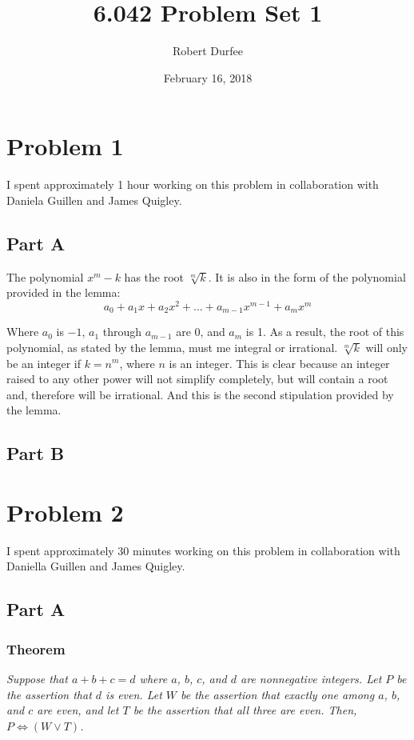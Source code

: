 \documentclass{article}
\title{ 6.042 Problem Set 1 }
\author{ Robert Durfee }
\date{ February 16, 2018 }
\begin{document}
\maketitle

\section*{Problem 1 }

I spent approximately 1 hour working on this problem in collaboration with
Daniela Guillen and James Quigley.

\subsection*{Part A}

The polynomial $ x^{m} - k $ has the root $\sqrt[m]{k}$. It is also in the form
of the polynomial provided in the lemma:
$$ a_{0} + a_{1}x + a_{2}x^{2} + \ldots + a_{m-1}x^{m-1} + a_{m}x^{m} $$

Where $a_{0}$ is $-1$, $a_{1}$ through $a_{m-1}$ are 0, and $a_{m}$ is 1. As a
result, the root of this polynomial, as stated by the lemma, must me integral or
irrational. $\sqrt[m]{k}$ will only be an integer if $k = n^{m}$, where $n$ is
an integer. This is clear because an integer raised to any other power will not
simplify completely, but will contain a root and, therefore will be irrational.
And this is the second stipulation provided by the lemma.

\subsection*{Part B}

\section*{Problem 2}

I spent approximately 30 minutes working on this problem in collaboration with
Daniella Guillen and James Quigley.

\subsection*{Part A}

\subsubsection*{Theorem}

\textit{Suppose that $a + b + c = d$ where $a$, $b$, $c$, and $d$ are nonnegative
integers. Let $P$ be the assertion that $d$ is even. Let $W$ be the assertion
that exactly one among $a$, $b$, and $c$ are even, and let $T$ be the assertion
that all three are even. Then, $ P \iff (W \lor T) $.}
\end{document}
